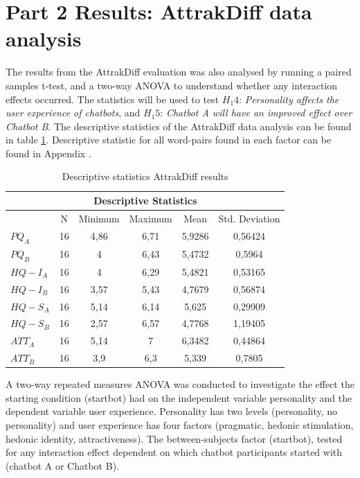 \section{Part 2 Results: AttrakDiff data analysis }
        
The results from the AttrakDiff evaluation was also analysed by running a paired samples t-test, and a two-way ANOVA to understand whether any interaction effects occurred. The statistics will be used to test $H_1 4$: \textit{Personality affects the user experience of chatbots}, and $H_1 5$: \textit{Chatbot A will have an improved effect over Chatbot B}. The descriptive statistics of the AttrakDiff data analysis can be found in table \ref{table:6}. Descriptive statistic for all word-pairs found in each factor can be found in Appendix .

\begin{table}[h]
\centering
\begin{tabular}{lccccc}
\hline
\multicolumn{6}{c}{\textbf{Descriptive Statistics}} \\
\hline
& N & Minimum & Maximum & Mean & Std. Deviation \\
$PQ_A$ & 16 & 4,86 & 6,71 & 5,9286 & 0,56424 \\
$PQ_B$ & 16 & 4 & 6,43 & 5,4732 & 0,5964 \\
$HQ-I_A$ & 16 & 4 & 6,29 & 5,4821 & 0,53165 \\
$HQ-I_B$ & 16 & 3,57 & 5,43 & 4,7679 & 0,56874 \\
$HQ-S_A$ & 16 & 5,14 & 6,14 & 5,625 & 0,29909 \\
$HQ-S_B$ & 16 & 2,57 & 6,57 & 4,7768 & 1,19405 \\
$ATT_A$ & 16 & 5,14 & 7 & 6,3482 & 0,44864 \\
$ATT_B$ & 16 & 3,9 & 6,3 & 5,339 & 0,7805 \\
\end{tabular}
\caption{Descriptive statistics AttrakDiff results}
 \label{table:6}
    \end{table}

A two-way repeated measures ANOVA was conducted to investigate the effect the starting condition (startbot) had on the independent variable personality and the dependent variable user experience. Personality has two levels (personality, no personality) and user experience has four factors (pragmatic, hedonic stimulation, hedonic identity, attractiveness). The between-subjects factor (startbot), tested for any interaction effect dependent on which chatbot participants started with (chatbot A or Chatbot B).

